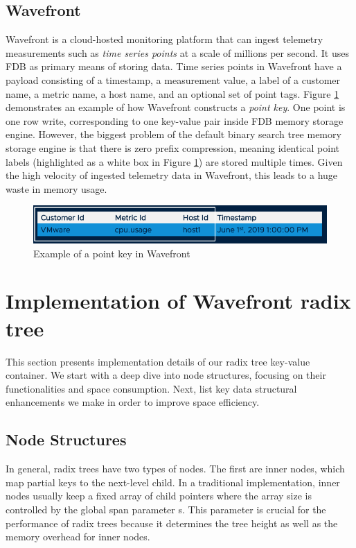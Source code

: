 \documentclass[sigplan,screen,nonacm]{acmart}
\begin{document}
\subsection{Wavefront}
Wavefront \cite{wavefront} is a cloud-hosted monitoring platform that can ingest telemetry measurements such as {\itshape time series points} at a scale of millions per second. It uses FDB as primary means of storing data. Time series points in Wavefront have a payload consisting of a timestamp, a measurement value, a label of a customer name, a metric name, a host name, and an optional set of point tags. Figure \ref{fig:point-key} demonstrates an example of how Wavefront constructs a {\itshape point key}. One point is one row write, corresponding to one key-value pair inside FDB memory storage engine. However, the biggest problem of the default binary search tree memory storage engine is that there is zero prefix compression, meaning identical point labels (highlighted as a white box in Figure \ref{fig:point-key}) are stored multiple times. Given the high velocity of ingested telemetry data in Wavefront, this leads to a huge waste in memory usage. 
\begin{figure}[h]
  \centering
  \includegraphics[width=\linewidth]{pic/point key.png}
  \setlength{\abovecaptionskip}{-10pt} 
  \setlength{\belowcaptionskip}{-7pt} 
  \caption{Example of a point key in Wavefront}
  \label{fig:point-key}
\end{figure}

\section{Implementation of Wavefront radix tree}
This section presents implementation details of our radix tree key-value container. We start with a deep dive into node structures, focusing on their functionalities and space consumption. Next, list key data structural enhancements we make in order to improve space efficiency.

\subsection{Node Structures}
In general, radix trees have two types of nodes. The first are inner nodes, which map partial keys to the next-level child. In a traditional implementation, inner nodes usually keep a fixed array of child pointers where the array size is controlled by the global span parameter s. This parameter is crucial for the performance of radix trees because it determines the tree height as well as the memory overhead for inner nodes. 
\end{document}
